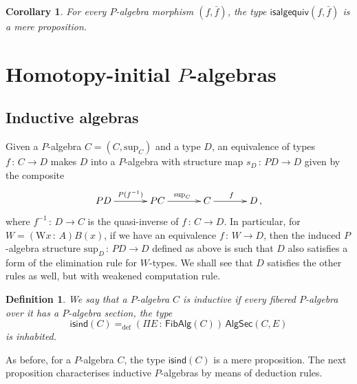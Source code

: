 \documentclass[10pt,a4paper,oneside,reqno]{amsart}
\numberwithin{equation}{section}
\theoremstyle{mythm}
\newtheorem{corollary}[theorem]{Corollary}
\theoremstyle{mydef}
\newtheorem{definition}[theorem]{Definition}
\theoremstyle{myrmk}
\newcommand{\ie}{\text{i.e.\ }}
\newcommand{\defeq}{=_{\mathrm{def}}}
\newcommand{\co}{\,{:}\,}
\newcommand{\isalgind}{\mathsf{isind}}
\newcommand{\W}{\mathrm{W}}
\renewcommand{\sup}{\mathrm{sup}}
\newcommand{\isalgequiv}{\mathsf{isalgequiv}}
\newcommand{\FibPalg}{\mathsf{FibAlg}}
\newcommand{\PalgSec}{\mathsf{AlgSec}}
\begin{document}
\begin{corollary} For every $P$-algebra morphism $(f, \bar{f})$, the type $\isalgequiv(f, \bar{f})$ is
a mere proposition. 
\end{corollary} 

 

\section{Homotopy-initial $P$-algebras}

\subsection{Inductive algebras}
Given a $P$-algebra $C = (C, \sup_C)$ and a type $D$, an equivalence of types $f \co C \to D$ makes $D$ into a $P$-algebra with structure map $s_D \co PD \to D$ given by the composite
\[
\xymatrix@C=1.2cm{
PD \ar[r]^{P(f^{-1})} & PC \ar[r]^{\sup_C} & C \ar[r]^f & D \, , }
\]
 where $f^{-1} \co D \to C$ is the quasi-inverse of $f \co C \to D$. In particular, for $W = (\W x \co A) B(x)$, if we have an equivalence  
 $f \co W \to D$, then the induced $P$-algebra structure $\sup_D \co PD \to D$ defined as above is such that $D$ also satisfies 
 a form of the elimination rule for $W$-types.  We shall see that $D$ satisfies the other rules as well, but with weakened computation rule.




\begin{definition}\label{def:Wind}
We say that a $P$-algebra $C$  is \emph{inductive} if every fibered $P$-algebra
over it has a $P$-algebra section, \ie the type
\[ 
\isalgind(C) \defeq (\Pi E \co \FibPalg(C)) \,  \PalgSec(C,E) 
\]  
is inhabited.
\end{definition}

As before, for a $P$-algebra $C$, the type $\isalgind(C)$ is a mere proposition. The next proposition characterises
inductive $P$-algebras by means of deduction rules.
\end{document}
